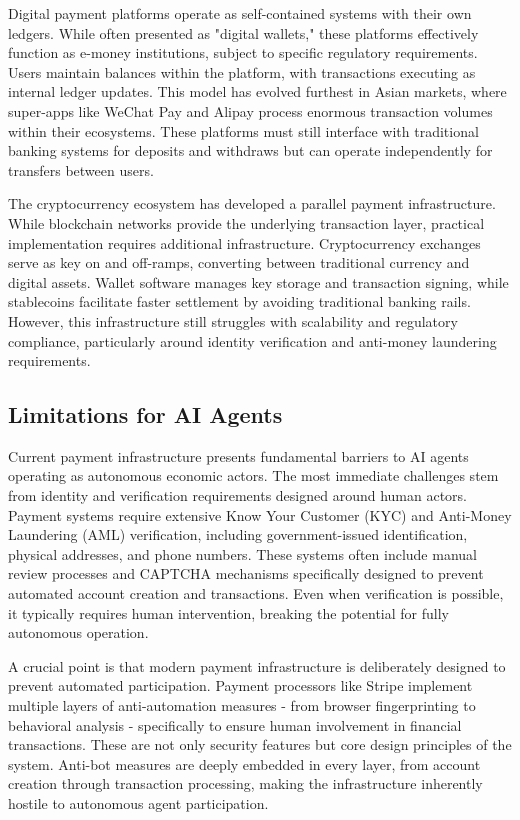\documentclass{article}
\begin{document}
Digital payment platforms operate as self-contained systems with their own ledgers. While often presented as "digital wallets," these platforms effectively function as e-money institutions, subject to specific regulatory requirements. Users maintain balances within the platform, with transactions executing as internal ledger updates. This model has evolved furthest in Asian markets, where super-apps like WeChat Pay and Alipay process enormous transaction volumes within their ecosystems. These platforms must still interface with traditional banking systems for deposits and withdraws but can operate independently for transfers between users.

The cryptocurrency ecosystem has developed a parallel payment infrastructure. While blockchain networks provide the underlying transaction layer, practical implementation requires additional infrastructure. Cryptocurrency exchanges serve as key on and off-ramps, converting between traditional currency and digital assets. Wallet software manages key storage and transaction signing, while stablecoins facilitate faster settlement by avoiding traditional banking rails. However, this infrastructure still struggles with scalability and regulatory compliance, particularly around identity verification and anti-money laundering requirements.

\subsection{Limitations for AI Agents}
\label{subsec:payments_limitations}
Current payment infrastructure presents fundamental barriers to AI agents operating as autonomous economic actors. The most immediate challenges stem from identity and verification requirements designed around human actors. Payment systems require extensive Know Your Customer (KYC) and Anti-Money Laundering (AML) verification, including government-issued identification, physical addresses, and phone numbers. These systems often include manual review processes and CAPTCHA mechanisms specifically designed to prevent automated account creation and transactions. Even when verification is possible, it typically requires human intervention, breaking the potential for fully autonomous operation.

A crucial point is that modern payment infrastructure is deliberately designed to prevent automated participation. Payment processors like Stripe implement multiple layers of anti-automation measures - from browser fingerprinting to behavioral analysis - specifically to ensure human involvement in financial transactions. These are not only security features but core design principles of the system. Anti-bot measures are deeply embedded in every layer, from account creation through transaction processing, making the infrastructure inherently hostile to autonomous agent participation.
\end{document}
